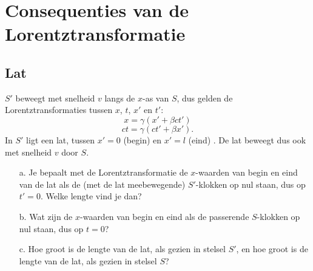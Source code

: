 \section{Consequenties van de Lorentztransformatie}\label{CLT}

\subsection{Lat}
$S'$ beweegt met snelheid $v$ langs de $x$-as van $S$, dus gelden de Lorentztransformaties tussen $x$, $t$, $x'$ en $t'$: 
\begin{displaymath}
   x = \gamma (x' + \beta ct') 
\end{displaymath}
\begin{displaymath}
  ct = \gamma (ct' + \beta x').
\end{displaymath}
In  $S'$  ligt een lat, tussen $x' = 0$ (begin) en $x' = l$ (eind) .
De lat beweegt dus ook met snelheid $v$ door $S$.
\begin{itemize}
\item [a.]
  Je  bepaalt met de Lorentztransformatie de $x$-waarden van begin en eind 
van de lat als de (met de lat meebewegende) $S'$-klokken op nul staan, 
dus op $t' = 0$. Welke lengte vind je dan?
\item [b.]
  Wat zijn de $x$-waarden van begin en eind als de passerende $S$-klokken 
op nul staan, dus op $t = 0$?
\item [c.]
  Hoe groot is de lengte van de lat, als gezien in stelsel $S'$, en hoe groot is 
de lengte van de lat, als gezien in stelsel $S$?
\end{itemize}


